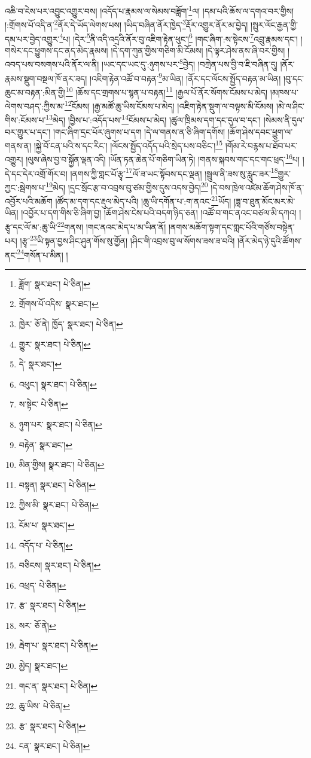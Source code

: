 འཆི་བ་ངེས་པར་འབྱུང་འགྱུར་བས། །འདོད་པ་རྣམས་ལ་སེམས་བཟློག་\footnote{ཟློག་  སྣར་ཐང་།  པེ་ཅིན། }ལ། །དམ་པའི་ཆོས་ལ་དགའ་བར་གྱིས། །:གྲོགས་པོ་འདི་ན་\footnote{གྲོགས་པོ་འདིས་  སྣར་ཐང་། }ནོར་དེ་ཡོད་ལེགས་པས། །ཡིད་བཞིན་ནོར་ཁྱེད་\footnote{ཁྱེར་  ཅོ་ནེ། ཁྱོད་  སྣར་ཐང་།  པེ་ཅིན། }རྡོར་འགྱུར་ནོར་མ་བྱེད། །སྤུར་ལོང་རྒྱན་གྱི་དམ་པར་བྱེད་འགྱུར་\footnote{གྱུར་  སྣར་ཐང་།  པེ་ཅིན། }པ། །དེར་\footnote{དེ་  སྣར་ཐང་། }ནི་འདི་འདྲའི་ནོར་བུ་འཇིག་རྟེན་ཕུང་།\footnote{འཕུང་།  སྣར་ཐང་།  པེ་ཅིན། } །གང་ཞིག་:ས་སྟེངས་\footnote{ས་སྟེང་  པེ་ཅིན། }འབྲུ་རྣམས་དང་། །གསེར་དང་ཕྱུགས་དང་ནད་མེད་རྣམས། །དེ་དག་ཀུན་གྱིས་གཅིག་མི་ངོམས། །དེ་ལྟར་ཤེས་ནས་ཞི་བར་གྱིས། །འབད་པས་བསགས་པའི་ནོར་ལ་ནི། །ཡང་དང་ཡང་དུ་:ཉུགས་པར་\footnote{ཉུག་པར་  སྣར་ཐང་།  པེ་ཅིན། }བྱེད། །བཀྲེན་པས་བྱི་བ་ཇི་བཞིན་དུ། །ནོར་རྣམས་སྡུག་བསྔལ་ཁོ་ནར་ཟད། །འཇིག་རྟེན་འཚོ་བ་བརྟན་\footnote{བརྟེན་  སྣར་ཐང་། }མ་ཡིན། །ནོར་དང་ལོངས་སྤྱོད་བརྟན་མ་ཡིན། །བུ་དང་ཆུང་མ་བརྟན་:མིན་གྱི།\footnote{མིན་གྱིས།  སྣར་ཐང་།  པེ་ཅིན། } །ཆོས་དང་གྲགས་པ་སྙན་པ་བརྟན།\footnote{བསྟན།  སྣར་ཐང་།  པེ་ཅིན། } །རྒྱལ་པོ་ནོར་སོགས་ངོམས་པ་མེད། །མཁས་པ་ལེགས་བཤད་:ཀྱིས་མ་\footnote{ཀྱིས་མི་  སྣར་ཐང་།  པེ་ཅིན། }ངོམས། །རྒྱ་མཚོ་ཆུ་ཡིས་ངོམས་པ་མེད། །འཇིག་རྟེན་སྡུག་ལ་བལྟས་མི་ངོམས། །མེ་ལ་ཤིང་གིས་:ངོམས་པ་\footnote{ངོམ་པ་  སྣར་ཐང་། }མེད། །བྱིས་པ་:འདོད་པས་\footnote{འདོད་པ་  པེ་ཅིན། }ངོམས་པ་མེད། །ཚུལ་ཁྲིམས་དག་དང་དུལ་བ་དང་། །སེམས་ནི་དུལ་བར་གྱུར་པ་དང་། །གང་ཞིག་དྲང་པོར་ཞུགས་པ་དག །དེ་ལ་གནས་ན་ཅི་ཞིག་དགོས། །ཆོག་ཤེས་དབང་ཕྱུག་ལ་གནས་ན། །སྐྱེ་བོ་ངན་པའི་ས་དང་རིང་། །ལོངས་སྤྱོད་འདོད་པའི་སྲེད་པས་བཅིང་།\footnote{བཅིངས།  སྣར་ཐང་།  པེ་ཅིན། } །གོམ་རེ་བརྙས་པ་ཐོབ་པར་འགྱུར། །ལུས་ཞེས་བྱ་བ་སྐྱོན་ལྡན་འདི། །ཡོན་ཏན་ཆེན་པོ་གཅིག་ཡིན་ཏེ། །གནས་སྐབས་གང་དང་གང་ཕྲད་\footnote{འཕྲད་  པེ་ཅིན། }པ། །དེ་དང་དེར་འགྲོ་གོར་བ། །ནགས་ཀྱི་གླང་པོ་རྩྭ་\footnote{རྩ་  སྣར་ཐང་།  པེ་ཅིན། }ལོ་ཟ་ཡང་སྟོབས་དང་ལྡན། །སྦྲུལ་ནི་ཟས་སུ་རླུང་ཟར་\footnote{སར་  ཅོ་ནེ། }གྱུར་ཀྱང་:སྦེགས་པ་\footnote{རྦེག་པ་  སྣར་ཐང་།  པེ་ཅིན། }མེད། །དྲང་སྲོང་རྩ་བ་འབྲས་བུ་ཙམ་གྱིས་དུས་འདས་བྱེད།\footnote{མྱེད།  སྣར་ཐང་། } །དེ་བས་ཁྲེལ་འཛེམ་ཆོག་ཤེས་ཁོ་ན་འབྱོར་པའི་མཆོག །ཚོད་མ་དག་དང་རྡུལ་མེད་པའི། །ཆུ་ཡི་དགོན་པ་:ག་ནའང་\footnote{གང་ན་  སྣར་ཐང་།  པེ་ཅིན། }ཡོད། །ཟླ་བ་ཐུན་མོང་མར་མེ་ཡིན། །འབྱོར་པ་དག་གིས་ཅི་ཞིག་བྱ། །ཆོག་ཤེས་ངེས་པའི་བདག་ཉིད་ཅན། །འཚོ་བ་གང་ནའང་བཙལ་མི་དཀའ། །རྩྭ་དང་ལོ་མ་:ཆུ་ཡི་\footnote{ཆུ་ཡིས་  པེ་ཅིན། }གནས། །གང་ནའང་མེད་པ་མ་ཡིན་ནོ། །ནགས་མཆོག་སྟག་དང་གླང་པོའི་གཙོས་བསྟེན་པར། །རྩྭ་\footnote{རྩ་  སྣར་ཐང་།  པེ་ཅིན། }ཡི་སྟན་བྱས་ཤིང་ཤུན་གོས་སུ་གྱོན། །ཤིང་གི་འབྲས་བུ་ལ་སོགས་ཟས་ཟ་བའི། །ནོར་མེད་ཉེ་དུའི་ཚོགས་ནང་\footnote{ངན་  སྣར་ཐང་།  པེ་ཅིན། }གསོན་པ་མིན། །
